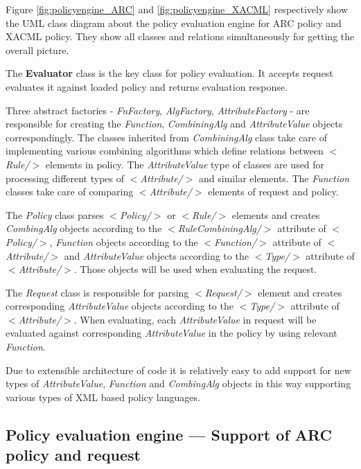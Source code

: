 \documentclass{article}                            %
\begin{document}
Figure \ref{fig:policyengine_ARC} and \ref{fig:policyengine_XACML} respectively show the UML class diagram about the policy evaluation engine for ARC policy and XACML policy. They show all classes and relations simultaneously for getting the overall picture.


The \textbf{Evaluator} class is the key class for policy evaluation. It accepts request evaluates it against loaded policy and returns evaluation response.

Three abstract factories - \textit{FnFactory}, \textit{AlgFactory}, \textit{AttributeFactory} - are responsible for creating the \textit{Function}, \textit{CombiningAlg} and \textit{AttributeValue} objects correspondingly. The classes inherited from \textit{CombiningAlg} class take care of implementing various combining algorithms which define relations between \textit{$<$Rule/$>$} elements in policy. The \textit{AttributeValue} type of classes are used for processing different types of \textit{$<$Attribute/$>$} and similar elements. The \textit{Function} classes take care of comparing \textit{$<$Attribute/$>$} elements of request and policy.

The \textit{Policy} class parses \textit{$<$Policy/$>$} or \textit{$<$Rule/$>$} elements and creates \textit{CombingAlg} objects according to the \textit{$<$RuleCombiningAlg/$>$} attribute of \textit{$<$Policy/$>$}, \textit{Function} objects according to the \textit{$<$Function/$>$} attribute of \textit{$<$Attribute/$>$} and \textit{AttributeValue} objects according to the \textit{$<$Type/$>$} attribute of \textit{$<$Attribute/$>$}. Those objects will be used when evaluating the request.

The \textit{Request} class is responsible for parsing \textit{$<$Request/$>$} element and creates corresponding \textit{AttributeValue} objects according to the \textit{$<$Type/$>$} attribute of \textit{$<$Attribute/$>$}. When evaluating, each \textit{AttributeValue} in request will be evaluated against corresponding \textit{AttributeValue} in the policy by using relevant \textit{Function}.

Due to extensible architecture of code it is relatively easy to add support for new types of \textit{AttributeValue}, \textit{Function} and \textit{CombingAlg} objects in this way supporting various types of XML based policy languages.

\subsection{Policy evaluation engine --- Support of ARC policy and request} %
\label{subsec:policy_engine_arc}
\end{document}
